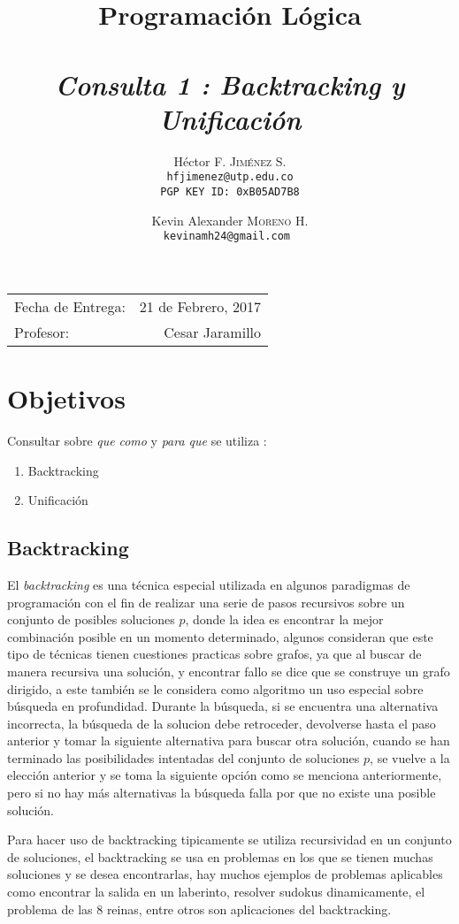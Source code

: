 \documentclass[paper=a4, fontsize=12pt]{article} 		%
\title{Programación Lógica\\ 
\horrule{0.5pt} \\[0.4cm] 								%
\textit{Consulta \textbf{1} : Backtracking y Unificación}
\horrule{1pt} \\[0.5cm] 			
}
\author{												%
Héctor F. \textsc{Jiménez S.}\\
\texttt{hfjimenez@utp.edu.co} \\
\texttt{PGP KEY ID: 0xB05AD7B8}
\and
Kevin Alexander \textsc{Moreno H.}\\
\texttt{kevinamh24@gmail.com }\\
}
\date{}    						                       %
\numberwithin{equation}{section}						%
\numberwithin{table}{section} 							%
\begin{document}
\maketitle                      			           %
\begin{center}
\begin{tabular}{l r}								   %
Fecha de Entrega: & 21 de Febrero, 2017 \\				   %
Profesor: & Cesar Jaramillo
\end{tabular}
\end{center}
\section{Objetivos}
Consultar sobre  \emph{que} \emph{como} y \emph{para que} se utiliza :
\begin{enumerate}
\item Backtracking
\item Unificación
\end{enumerate}
\subsection{Backtracking }
El \emph{backtracking} es una técnica especial utilizada en algunos paradigmas de programación con el fin de realizar una serie de pasos recursivos sobre un conjunto de posibles soluciones $p$, donde la idea es encontrar la mejor combinación posible en un momento determinado, algunos consideran que este tipo de técnicas tienen cuestiones practicas sobre grafos, ya que al buscar de manera recursiva una solución, y encontrar fallo se dice que se construye un grafo dirigido, a este también se le considera como algoritmo un uso especial sobre búsqueda en profundidad. Durante la búsqueda, si se encuentra una alternativa incorrecta, la búsqueda de la solucion debe retroceder, devolverse hasta el paso anterior y tomar la siguiente alternativa para buscar otra solución, cuando se han terminado las posibilidades intentadas del conjunto de soluciones $p$, se vuelve a la elección anterior y se toma la siguiente opción como se menciona anteriormente, pero si no hay más alternativas la búsqueda falla por que no existe una posible solución.

Para hacer uso de backtracking tipicamente se utiliza recursividad en un conjunto de soluciones, el backtracking se usa en problemas en los que se tienen muchas soluciones y se desea encontrarlas, hay muchos ejemplos de problemas aplicables como encontrar la salida en un laberinto, resolver sudokus dinamicamente, el problema de las 8 reinas, entre otros son aplicaciones del backtracking.
\end{document}

